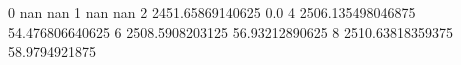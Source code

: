 0 nan nan
1 nan nan
2 2451.65869140625 0.0
4 2506.135498046875 54.476806640625
6 2508.5908203125 56.93212890625
8 2510.63818359375 58.9794921875

